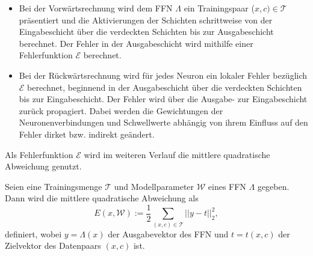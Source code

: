 \begin{itemize}
    \item Bei der Vorwärtsrechnung wird dem FFN $\Lambda$ ein Trainingspaar ($x,c) \in \mathcal{T}$ präsentiert und die Aktivierungen der Schichten schrittweise von der Eingabeschicht über die verdeckten Schichten bis zur Ausgabeschicht berechnet. Der Fehler in der Ausgabeschicht wird mithilfe einer Fehlerfunktion $\mathcal{E}$ berechnet.
    \item Bei der Rückwärtsrechnung wird für jedes Neuron ein lokaler Fehler bezüglich $\mathcal{E}$ berechnet, beginnend in der Ausgabeschicht über die verdeckten Schichten bis zur Eingabeschicht. Der Fehler wird über die Ausgabe- zur Eingabeschicht zurück propagiert. Dabei werden die Gewichtungen der Neuronenverbindungen und Schwellwerte abhängig von ihrem Einfluss auf den Fehler dirket bzw. indirekt geändert.
\end{itemize}
Als Fehlerfunktion $\mathcal{E}$ wird im weiteren Verlauf die mittlere quadratische Abweichung genutzt.
\begin{defi}
    \label{def:MSE}
    Seien eine Trainingsmenge $\mathcal{T}$ und Modellparameter $\mathcal{W}$ eines FFN $\Lambda$ gegeben. Dann wird die mittlere quadratische Abweichung als
\begin{equation*}
    E(x, \mathcal{W}):=\frac{1}{2} \sum_{(x,c) \in \mathcal{T}} ||y-t||_2^2,
\end{equation*}
definiert, wobei $y=\Lambda(x)$ der Ausgabevektor des FFN und $t=t(x,c)$ der Zielvektor des Datenpaars $(x,c)$ ist.
\end{defi}

